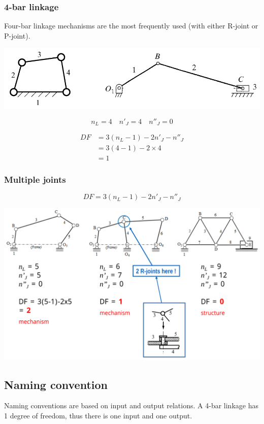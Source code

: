 \documentclass[11pt]{article}
\begin{document}
\subsubsection{4-bar linkage}
\label{sec:orgff1aacd}
Four-bar linkage mechanisms are the most frequently used (with either R-joint or P-joint).

\begin{center}
\includegraphics[width=.9\linewidth]{./images/4-bar-linkage-example.png}
\end{center}

\[n_L = 4 \quad n'_J = 4 \quad n''_J = 0\]

\begin{align*}
DF &= 3 (n_L - 1) - 2n'_J - n''_J \\
&= 3 (4 - 1) - 2 \times 4 \\
&= 1
\end{align*}

 \newpage
\subsubsection{Multiple joints}
\label{sec:orgcc42cd2}
\[DF = 3(n_L - 1) - 2n'_J - n''_J\]

\begin{center}
\includegraphics[width=.9\linewidth]{./images/multiple-joints-image.png}
\end{center}
\subsection{Naming convention}
\label{sec:orgef62c06}
Naming conventions are based on input and output relations. A 4-bar linkage has 1 degree of freedom, thus there is one input and one output.
\end{document}
